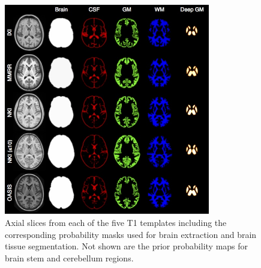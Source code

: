 \begin{figure}
  \centering
  \includegraphics[width=90mm]{Figures/templateProbabilityMasks.jpg}
  \caption{Axial slices from each of the five T1 templates including the corresponding
  probability masks used for brain extraction and brain tissue segmentation.  Not shown
  are the prior probability maps for brain stem and cerebellum regions.
  }
  \label{fig:templateMasks}
\end{figure}



